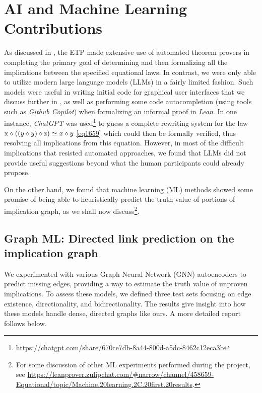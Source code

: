 \section{AI and Machine Learning Contributions}\label{ml-sec}

As discussed in , the ETP made extensive use of automated theorem provers in completing the primary goal of determining and then formalizing all the implications between the specified equational laws.  In contrast, we were only able to utilize modern large language models (LLMs) in a fairly limited fashion.  Such models were useful in writing initial code for graphical user interfaces that we discuss further in , as well as performing some code autocompletion (using tools such as \emph{Github Copilot}) when formalizing an informal proof in \emph{Lean}.  In one instance, \emph{ChatGPT} was used\footnote{\url{https://chatgpt.com/share/670ce7db-8a44-800d-a5dc-8462c12eca3b}} to guess a complete rewriting system for the law $\mathrm{x} \diamond ((y \diamond y) \diamond \mathrm{z}) \simeq x \diamond y$ \eqref{eq1659} which could then be formally verified, thus resolving all implications from this equation. However, in most of the difficult implications that resisted automated approaches, we found that LLMs did not provide useful suggestions beyond what the human participants could already propose.

On the other hand, we found that machine learning (ML) methods showed some promise of being able to heuristically predict the truth value of portions of implication graph, as we shall now discuss\footnote{For some discussion of other ML experiments performed during the project, see \url{https://leanprover.zulipchat.com/\#narrow/channel/458659-Equational/topic/Machine.20learning.2C.20first.20results}.}.

\subsection{Graph ML: Directed link prediction on the implication graph}
\label{sec:dlp}

We experimented with various Graph Neural Network (GNN) autoencoders to predict missing edges,
providing a way to estimate the truth value of unproven implications. To assess these models,
we defined three test sets focusing on edge existence, directionality, and bidirectionality.
The results give insight into how these models handle dense, directed graphs like ours.
A more detailed report follows below.


